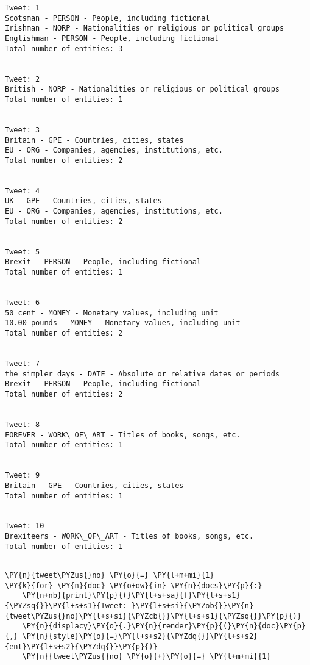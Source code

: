     \begin{Verbatim}[commandchars=\\\{\}]
Tweet: 1
Scotsman - PERSON - People, including fictional
Irishman - NORP - Nationalities or religious or political groups
Englishman - PERSON - People, including fictional
Total number of entities: 3


Tweet: 2
British - NORP - Nationalities or religious or political groups
Total number of entities: 1


Tweet: 3
Britain - GPE - Countries, cities, states
EU - ORG - Companies, agencies, institutions, etc.
Total number of entities: 2


Tweet: 4
UK - GPE - Countries, cities, states
EU - ORG - Companies, agencies, institutions, etc.
Total number of entities: 2


Tweet: 5
Brexit - PERSON - People, including fictional
Total number of entities: 1


Tweet: 6
50 cent - MONEY - Monetary values, including unit
10.00 pounds - MONEY - Monetary values, including unit
Total number of entities: 2


Tweet: 7
the simpler days - DATE - Absolute or relative dates or periods
Brexit - PERSON - People, including fictional
Total number of entities: 2


Tweet: 8
FOREVER - WORK\_OF\_ART - Titles of books, songs, etc.
Total number of entities: 1


Tweet: 9
Britain - GPE - Countries, cities, states
Total number of entities: 1


Tweet: 10
Brexiteers - WORK\_OF\_ART - Titles of books, songs, etc.
Total number of entities: 1


    \end{Verbatim}

    \begin{tcolorbox}[breakable, size=fbox, boxrule=1pt, pad at break*=1mm,colback=cellbackground, colframe=cellborder]
\begin{Verbatim}[commandchars=\\\{\}]
\PY{n}{tweet\PYZus{}no} \PY{o}{=} \PY{l+m+mi}{1}
\PY{k}{for} \PY{n}{doc} \PY{o+ow}{in} \PY{n}{docs}\PY{p}{:}
    \PY{n+nb}{print}\PY{p}{(}\PY{l+s+sa}{f}\PY{l+s+s1}{\PYZsq{}}\PY{l+s+s1}{Tweet: }\PY{l+s+si}{\PYZob{}}\PY{n}{tweet\PYZus{}no}\PY{l+s+si}{\PYZcb{}}\PY{l+s+s1}{\PYZsq{}}\PY{p}{)}
    \PY{n}{displacy}\PY{o}{.}\PY{n}{render}\PY{p}{(}\PY{n}{doc}\PY{p}{,} \PY{n}{style}\PY{o}{=}\PY{l+s+s2}{\PYZdq{}}\PY{l+s+s2}{ent}\PY{l+s+s2}{\PYZdq{}}\PY{p}{)}
    \PY{n}{tweet\PYZus{}no} \PY{o}{+}\PY{o}{=} \PY{l+m+mi}{1}
\end{Verbatim}
\end{tcolorbox}

